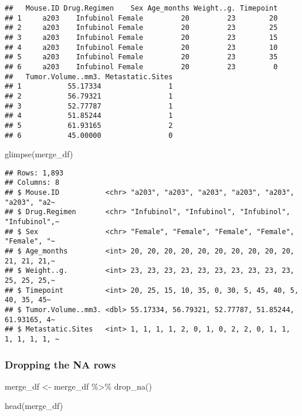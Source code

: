 \documentclass[
]{article}
\newenvironment{Shaded}{\begin{snugshade}}{\end{snugshade}}
\newcommand{\FunctionTok}[1]{\textcolor[rgb]{0.00,0.00,0.00}{#1}}
\newcommand{\NormalTok}[1]{#1}
\newcommand{\OtherTok}[1]{\textcolor[rgb]{0.56,0.35,0.01}{#1}}
\newcommand{\SpecialCharTok}[1]{\textcolor[rgb]{0.00,0.00,0.00}{#1}}
\begin{document}
\begin{verbatim}
##   Mouse.ID Drug.Regimen    Sex Age_months Weight..g. Timepoint
## 1     a203    Infubinol Female         20         23        20
## 2     a203    Infubinol Female         20         23        25
## 3     a203    Infubinol Female         20         23        15
## 4     a203    Infubinol Female         20         23        10
## 5     a203    Infubinol Female         20         23        35
## 6     a203    Infubinol Female         20         23         0
##   Tumor.Volume..mm3. Metastatic.Sites
## 1           55.17334                1
## 2           56.79321                1
## 3           52.77787                1
## 4           51.85244                1
## 5           61.93165                2
## 6           45.00000                0
\end{verbatim}

\begin{Shaded}
\begin{Highlighting}[]
\FunctionTok{glimpse}\NormalTok{(merge\_df)}
\end{Highlighting}
\end{Shaded}

\begin{verbatim}
## Rows: 1,893
## Columns: 8
## $ Mouse.ID           <chr> "a203", "a203", "a203", "a203", "a203", "a203", "a2~
## $ Drug.Regimen       <chr> "Infubinol", "Infubinol", "Infubinol", "Infubinol",~
## $ Sex                <chr> "Female", "Female", "Female", "Female", "Female", "~
## $ Age_months         <int> 20, 20, 20, 20, 20, 20, 20, 20, 20, 20, 21, 21, 21,~
## $ Weight..g.         <int> 23, 23, 23, 23, 23, 23, 23, 23, 23, 23, 25, 25, 25,~
## $ Timepoint          <int> 20, 25, 15, 10, 35, 0, 30, 5, 45, 40, 5, 40, 35, 45~
## $ Tumor.Volume..mm3. <dbl> 55.17334, 56.79321, 52.77787, 51.85244, 61.93165, 4~
## $ Metastatic.Sites   <int> 1, 1, 1, 1, 2, 0, 1, 0, 2, 2, 0, 1, 1, 1, 1, 1, 1, ~
\end{verbatim}

\hypertarget{dropping-the-na-rows}{%
\subsubsection{Dropping the NA rows}\label{dropping-the-na-rows}}

\begin{Shaded}
\begin{Highlighting}[]
\NormalTok{merge\_df }\OtherTok{\textless{}{-}}\NormalTok{ merge\_df }\SpecialCharTok{\%\textgreater{}\%} \FunctionTok{drop\_na}\NormalTok{()}

\FunctionTok{head}\NormalTok{(merge\_df)}
\end{Highlighting}
\end{Shaded}
\end{document}
